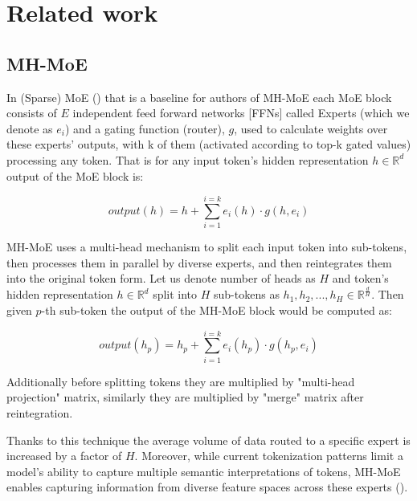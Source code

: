 \documentclass[12pt]{article}
\begin{document}
\section{Related work}

\subsection{MH-MoE} 
In (Sparse) MoE (\cite{shazeer2017outrageously}) that is a baseline for authors of MH-MoE each MoE block consists of $E$ independent feed forward networks [FFNs] called Experts (which we denote as $e_i$) and a gating function (router), $g$, used to calculate weights over these experts' outputs, with k of them (activated according to top-k gated values) processing any token. That is for any input token's hidden representation $h \in \mathbb{R}^d$ output of the MoE block is:

\[ output(h)=h+\sum_{i=1}^{i=k} e_i (h)  \cdot g(h, e_i)\]

MH-MoE uses a multi-head mechanism to split each input token into sub-tokens, then processes them in parallel by diverse experts, and then reintegrates them into the original token form. Let us denote number of heads as $H$ and token's hidden representation $h \in \mathbb{R}^d $ split into $H$ sub-tokens as $h_1,h_2,...,h_H \in \mathbb{R}^{\frac{d}{H}} $. Then given $p$-th sub-token the output of the MH-MoE block would be computed as:

\[ output(h_p)= h_p + \sum_{i=1}^{i=k} e_i (h_p)  \cdot g(h_p,e_i)\]

Additionally before splitting tokens they are multiplied by "multi-head projection" matrix, similarly they are multiplied by "merge" matrix after reintegration.

Thanks to this technique the average volume of data routed to a specific expert is increased by a factor of $H$.
Moreover, while current tokenization patterns limit a model's ability to capture multiple semantic interpretations of tokens, MH-MoE enables capturing information from diverse feature spaces across these experts (\cite{wu2024multihead}).
\end{document}
